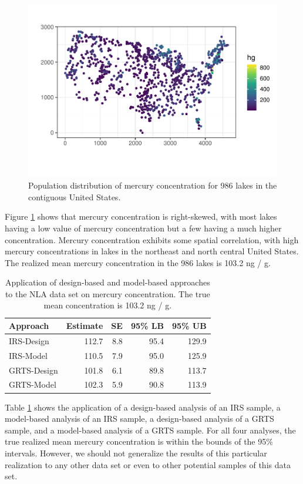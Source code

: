\documentclass[]{elsarticle} %
\begin{document}
\begin{figure}
\includegraphics[width=1\linewidth]{manuscript_files/figure-latex/figdata-1} \caption{Population distribution of mercury concentration for 986 lakes in the contiguous United States.}\label{fig:figdata}
\end{figure}

Figure \ref{fig:figdata} shows that mercury concentration is
right-skewed, with most lakes having a low value of mercury
concentration but a few having a much higher concentration. Mercury
concentration exhibits some spatial correlation, with high mercury
concentrations in lakes in the northeast and north central United
States. The realized mean mercury concentration in the 986 lakes is
103.2 ng / g.

\begin{table}[ht]
\centering
\begin{tabular}{lrrrr}
  \hline
Approach & Estimate & SE & 95\% LB & 95\% UB \\ 
  \hline
IRS-Design & 112.7 & 8.8 & 95.4 & 129.9 \\ 
  IRS-Model & 110.5 & 7.9 & 95.0 & 125.9 \\ 
  GRTS-Design & 101.8 & 6.1 & 89.8 & 113.7 \\ 
  GRTS-Model & 102.3 & 5.9 & 90.8 & 113.9 \\ 
   \hline
\end{tabular}
\caption{\label{tab:appliedtab} Application of design-based and model-based approaches to the NLA data set on mercury concentration. The true mean concentration is 103.2 ng / g.} 
\end{table}

Table \ref{tab:appliedtab} shows the application of a design-based
analysis of an IRS sample, a model-based analysis of an IRS sample, a
design-based analysis of a GRTS sample, and a model-based analysis of a
GRTS sample. For all four analyses, the true realized mean mercury
concentration is within the bounds of the 95\% intervals. However, we
should not generalize the results of this particular realization to any
other data set or even to other potential samples of this data set.
\end{document}
